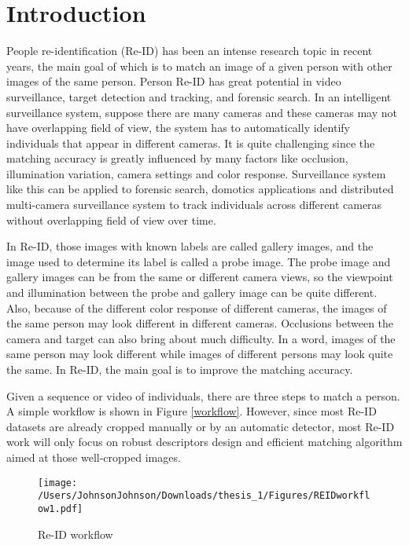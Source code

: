 \chapter{Introduction}

People re-identification (Re-ID) has been an intense research topic in recent years, the main goal of which is to match an image of a given person with other images of the same person. Person Re-ID has great potential in video surveillance, target detection and tracking, and forensic search. In an intelligent 
surveillance system, suppose there are many cameras and these cameras may not have overlapping field of view, the system has to automatically identify individuals that appear in different cameras. It is quite challenging since the matching accuracy is greatly influenced by many factors like occlusion, illumination variation, camera settings and color response. Surveillance system like this can be applied to forensic search, domotics applications and distributed multi-camera surveillance system to track individuals across different cameras without overlapping field of view over time.

In Re-ID, those images with known labels are called gallery images, and the image used to determine its label is called a probe image. The probe image and gallery images can be from the same or different camera views, so the viewpoint and illumination between the probe and gallery image can be quite different. Also, because of the different color response of different cameras, the images of the same person may look different in different cameras. Occlusions between the camera and target can also bring about much difficulty.  In a word, images of the same person may look different while images of different persons may look quite the same. In Re-ID, the main goal is to improve the matching accuracy.

Given a sequence or video of individuals, there are three steps to match a person. A simple workflow is shown in Figure \ref{workflow}. However, since most Re-ID datasets are already cropped manually or by an automatic detector, most Re-ID work will only focus on robust descriptors design and efficient matching algorithm aimed at those well-cropped images. 


\begin{figure}[H]
\centering
\texttt{[image: /Users/JohnsonJohnson/Downloads/thesis\_1/Figures/REIDworkflow1.pdf]}
\vspace{1em}
\caption{Re-ID workflow}
\end{figure}
\label{workflow}


